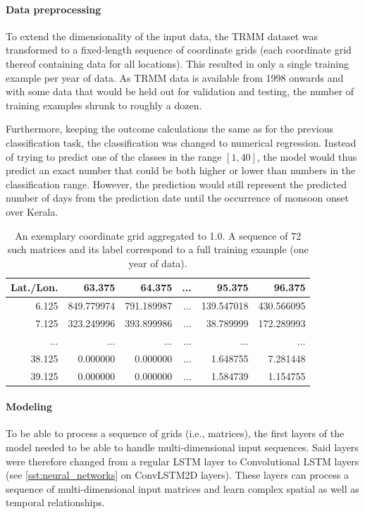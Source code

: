 \paragraph{Data preprocessing}
\label{ssst:nn_t3_data}
To extend the dimensionality of the input data, the TRMM dataset was transformed to a fixed-length sequence of coordinate grids (each coordinate grid thereof containing data for all locations). This resulted in only a single training example per year of data. As TRMM data is available from 1998 onwards and with some data that would be held out for validation and testing, the number of training examples shrunk to roughly a dozen.

Furthermore, keeping the outcome calculations the same as for the previous classification task, the classification was changed to numerical regression. Instead of trying to predict one of the classes in the range $\left[ 1, 40 \right]$, the model would thus predict an exact number that could be both higher or lower than numbers in the classification range. However, the prediction would still represent the predicted number of days from the prediction date until the occurrence of monsoon onset over Kerala.

\begin{table}[h!]
  \centering
  \begin{tabular}{rrrrrr}
    \toprule
    \textbf{Lat./Lon.} & \textbf{63.375} & \textbf{64.375} & \textbf{...} & \textbf{95.375} & \textbf{96.375} \\
    \midrule
    6.125 & 849.779974 & 791.189987 & ... & 139.547018 & 430.566095 \\
    7.125 & 323.249996 & 393.899986 & ... & 38.789999 & 172.289993 \\
    ... & ... & ... & ... & ... & ...\\
    38.125 & 0.000000 & 0.000000 & ... & 1.648755 & 7.281448 \\
    39.125 & 0.000000 & 0.000000 & ... & 1.584739 & 1.154755 \\
    \bottomrule
  \end{tabular}
  \caption{An exemplary coordinate grid aggregated to 1.0\degree. A sequence of 72 such matrices and its label correspond to a full training example (one year of data).}
  \label{tab:nn_t3_data}
\end{table}

\paragraph{Modeling}
\label{ssst:nn_t3_model}
To be able to process a sequence of grids (i.e., matrices), the first layers of the model needed to be able to handle multi-dimensional input sequences. Said layers were therefore changed from a regular LSTM layer to Convolutional LSTM layers (see \cref{sst:neural_networks} on ConvLSTM2D layers). These layers can process a sequence of multi-dimensional input matrices and learn complex spatial as well as temporal relationships.

